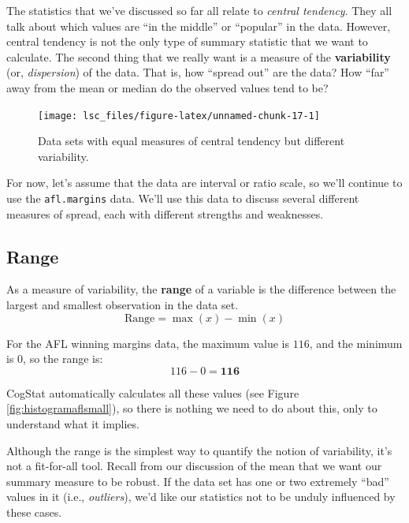 \documentclass[
  11pt,
  a4paper,
  twoside,symmetric,openright]{book}
\theoremstyle{break}
\theoremstyle{break}
\begin{document}
The statistics that we've discussed so far all relate to \emph{central tendency}. They all talk about which values are ``in the middle'' or ``popular'' in the data. However, central tendency is not the only type of summary statistic that we want to calculate. The second thing that we really want is a measure of the \textbf{variability} (or, \emph{dispersion}) of the data. That is, how ``spread out'' are the data? How ``far'' away from the mean or median do the observed values tend to be?

\begin{figure}

{\centering \texttt{[image: lsc\_files/figure-latex/unnamed-chunk-17-1]} 

}

\caption{Data sets with equal measures of central tendency but different variability.}\label{fig:unnamed-chunk-17}
\end{figure}

For now, let's assume that the data are interval or ratio scale, so we'll continue to use the \texttt{afl.margins} data. We'll use this data to discuss several different measures of spread, each with different strengths and weaknesses.

\subsection{Range}\label{range}

\begin{definition}[Range]
\protect\hypertarget{def:defrange}{}\label{def:defrange}As a measure of variability, the \textbf{range} of a variable is the difference between the largest and smallest observation in the data set.
\[
\text{Range}=\max(x)-\min(x)
\]
\end{definition}

\begin{example}[Range]
\protect\hypertarget{exm:exrange}{}\label{exm:exrange}For the AFL winning margins data, the maximum value is \(116\), and the minimum is \(0\), so the range is:
\[116-0=\mathbf{116}\]
\end{example}

CogStat automatically calculates all these values (see Figure \ref{fig:histogramaflsmall}), so there is nothing we need to do about this, only to understand what it implies.

Although the range is the simplest way to quantify the notion of variability, it's not a fit-for-all tool. Recall from our discussion of the mean that we want our summary measure to be robust. If the data set has one or two extremely ``bad'' values in it (i.e., \emph{outliers}), we'd like our statistics not to be unduly influenced by these cases.
\end{document}
